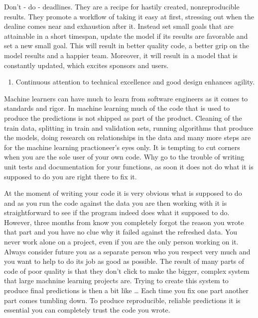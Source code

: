 \documentclass[]{book}
\providecommand{\tightlist}{%
  \setlength{\itemsep}{0pt}\setlength{\parskip}{0pt}}
\begin{document}
Don't - do - deadlines. They are a recipe for hastily created, nonreproducible results. They promote a workflow of taking it easy at first, stressing out when the dealine comes near and exhaustion after it. Instead set small goals that are attainable in a short timespan, update the model if its results are favorable and set a new small goal. This will result in better quality code, a better grip on the model results and a happier team. Moreover, it will result in a model that is constantly updated, which excites sponsors and users.

\begin{enumerate}
\def\labelenumi{\arabic{enumi})}
\setcounter{enumi}{8}
\tightlist
\item
  Continuous attention to technical excellence and good design enhances agility.
\end{enumerate}

Machine learners can have much to learn from software engineers as it comes to standards and rigor. In machine learning much of the code that is used to produce the predictions is not shipped as part of the product. Cleaning of the train data, splitting in train and validation sets, running algorithms that produce the models, doing research on relationships in the data and many more steps are for the machine learning practioneer's eyes only. It is tempting to cut corners when you are the sole user of your own code. Why go to the trouble of writing unit tests and documentation for your functions, as soon it does not do what it is supposed to do you are right there to fix it.

At the moment of writing your code it is very obvious what is supposed to do and as you run the code against the data you are then working with it is straightforward to see if the program indeed does what it supposed to do. However, three months from know you completely forgot the reason you wrote that part and you have no clue why it failed against the refreshed data. You never work alone on a project, even if you are the only person working on it. Always consider future you as a separate person who you respect very much and you want to help to do its job as good as possible. The result of many parts of code of poor quality is that they don't click to make the bigger, complex system that large machnine learning projects are. Trying to create this system to produce final predictions is then a bit like \ldots{} Each time you fix one part another part comes tumbling down. To produce reproducible, reliable predictions it is essential you can completely trust the code you wrote.
\end{document}
